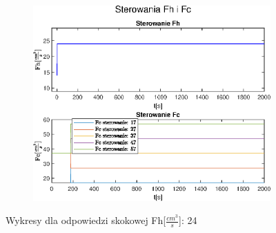 \begin{figure}[h!]
   \begin{subfigure}[b]{0.6\textwidth}
      \includegraphics[width=1\linewidth]{img/step-responses/stepResponseU24.eps}
      \caption{}
      \label{fig:fig:stepResponsesFh243}
   \end{subfigure}
       
   \caption{Wykresy dla odpowiedzi skokowej Fh[$\frac{cm^3}{s}$]: 24}
   \label{fig:stepResponsesFh24}
\end{figure}
           
